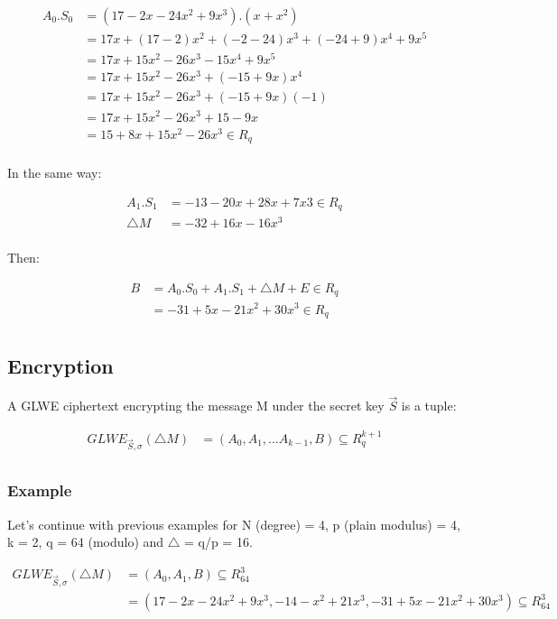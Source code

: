 \documentclass{techrep}
\theoremstyle{definition}
\theoremstyle{plain}
\begin{document}
	\begin{align*}
		 A_0.S_0 &=  (17-2x -24x^2 +9x^3).(x + x^2) \\
            &= 17x + (17-2)x^2 + (-2-24)x^3 + (-24+9)x^4 + 9x^5  \\
            &= 17x + 15x^2 -26x^3 - 15x^4 + 9x^5  \\
            &= 17x + 15x^2 -26x^3 + (-15 + 9x)x^4  \\
            &= 17x + 15x^2 -26x^3 + (-15 + 9x)(-1)  \\
            &= 17x + 15x^2 -26x^3 + 15  -9x  \\
            &= 15 + 8x + 15x^2 -26x^3  \in R_q \\
	\end{align*}

In the same way:

	\begin{align*}
		 A_1.S_1 &=  -13-20x+28x+7x3 \in R_q \\
         \bigtriangleup M &= -32 +16x - 16x^3  \\
	\end{align*}

Then:

	\begin{align*}
		 B &=   A_0.S_0 + A_1.S_1 + \bigtriangleup M + E \in R_q  \\
          &= -31 + 5x - 21x^2 + 30x^3 \in R_q  \\
	\end{align*}


	\subsection{Encryption}
A GLWE ciphertext encrypting the message M under the secret key $\overrightarrow{S}$ is a tuple:

	\begin{align*}
GLWE_{\overrightarrow{S},\sigma}(\bigtriangleup M)	&=	 (A_0,A_1,...A_{k-1}, B) \subseteq  R_{q}^{k+1} \\
	\end{align*}

\subsubsection{Example}
Let’s continue with previous examples for N (degree) = 4, p (plain modulus) = 4, k = 2, q = 64 (modulo) and $\bigtriangleup$ = q/p = 16.


	\begin{align*}
        GLWE_{\overrightarrow{S},\sigma}(\bigtriangleup M)	&=	 (A_0,A_{1}, B) \subseteq  R_{64}^{3} \\
        &= (17-2x -24x^2 +9x^3, -14-x^2+21x^3, -31 + 5x - 21x^2 + 30x^3) \subseteq  R_{64}^{3} 
	\end{align*}
\end{document}
